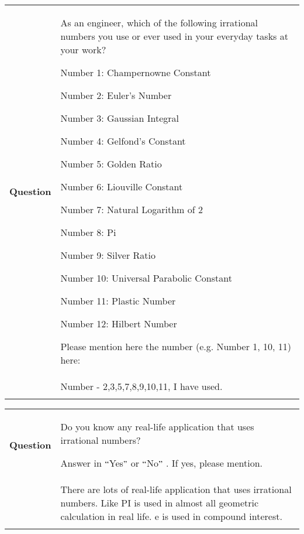 \documentclass[12pt, letterpaper]{article}
\begin{document}
\begin{table}[H]
 			\centering
\begin{tabular}{p{0.72in}p{5.37in}}
\hline

\multicolumn{1}{|p{0.72in}}{\textbf{Question}} & 
\multicolumn{1}{|p{5.37in}|}{As an engineer, which of the following irrational numbers you use or ever used in your everyday tasks at your work? 
\vspace{\baselineskip}
 \par Number 1: Champernowne Constant \par Number 2: Euler’s Number \par Number 3: Gaussian Integral \par Number 4: Gelfond’s Constant \par Number 5: Golden Ratio \par Number 6: Liouville Constant \par Number 7: Natural Logarithm of 2 \par Number 8: Pi \par Number 9: Silver Ratio \par Number 10: Universal Parabolic Constant \par Number 11: Plastic Number \par Number 12: Hilbert Number 
 \vspace{\baselineskip}
 \par Please mention here the number (e.g. Number 1, 10, 11) here: \par } \\
\hhline{--}

\multicolumn{1}{|p{0.72in}}{\textbf{Response}} & 
\multicolumn{1}{|p{5.37in}|}{Number - 2,3,5,7,8,9,10,11, I have used.} \\
\hhline{--}

\end{tabular}
 \end{table}


\begin{table}[H]
 			\centering
\begin{tabular}{p{0.72in}p{5.37in}}
\hline

\multicolumn{1}{|p{0.72in}}{\textbf{Question}} & 
\multicolumn{1}{|p{5.37in}|}{Do you know any real-life application that uses irrational numbers?  \par Answer in $``$Yes$"$  or $``$No$"$ . If yes, please mention. \par } \\
\hhline{--}

\multicolumn{1}{|p{0.72in}}{\textbf{Response}} & 
\multicolumn{1}{|p{5.37in}|}{There are lots of real-life application that uses irrational numbers. Like PI is used in almost all geometric calculation in real life. e is used in compound interest.} \\
\hhline{--}

\end{tabular}
 \end{table}
\end{document}
